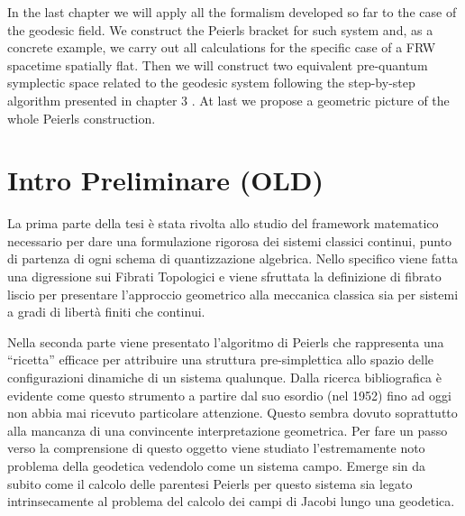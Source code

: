 \documentclass[Main]{subfiles}
\begin{document}
In the last chapter we will apply all the formalism developed so far to the case of the geodesic field.
We construct the Peierls bracket for such system and, as a  concrete example, we carry out all calculations for the specific case of a FRW spacetime spatially flat.
Then we will construct two equivalent pre-quantum symplectic space related to the geodesic system following the step-by-step algorithm presented in chapter 3 .
At last we propose a geometric picture of the whole Peierls construction.


\section{Intro Preliminare (OLD)}



La prima parte della tesi è stata rivolta allo studio del framework matematico necessario per dare una formulazione rigorosa dei sistemi classici continui, punto di partenza di ogni schema di quantizzazione algebrica.
Nello specifico viene fatta una digressione sui Fibrati Topologici e viene sfruttata la definizione di fibrato liscio per presentare l'approccio geometrico alla meccanica classica sia per sistemi a gradi di libertà finiti che continui.

Nella seconda parte viene presentato l'algoritmo di Peierls che rappresenta una “ricetta” efficace per attribuire una struttura pre-simplettica allo spazio delle configurazioni dinamiche di un sistema qualunque.
Dalla ricerca bibliografica è evidente come questo strumento a partire dal suo esordio (nel 1952) fino ad oggi non abbia mai ricevuto particolare attenzione. Questo sembra dovuto soprattutto alla mancanza di una convincente interpretazione geometrica.
\newline
Per fare un passo verso la comprensione di questo oggetto viene studiato l’estremamente noto problema della geodetica vedendolo come un sistema campo.
Emerge sin da subito come il calcolo delle parentesi Peierls per questo sistema sia legato intrinsecamente al problema del calcolo dei campi di Jacobi lungo una geodetica.
\end{document}
